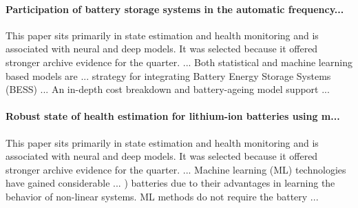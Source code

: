 \documentclass[conference]{IEEEtran}
\begin{document}
\paragraph{Participation of battery storage systems in the automatic frequency...} This paper sits primarily in state estimation and health monitoring and is associated with neural and deep models. It was selected because it offered stronger archive evidence for the quarter. ... Both statistical and machine learning based models are ... strategy for integrating Battery Energy Storage Systems (BESS) ... An in-depth cost breakdown and battery-ageing model support ... \cite{participationofbattery2020}

\paragraph{Robust state of health estimation for lithium-ion batteries using m...} This paper sits primarily in state estimation and health monitoring and is associated with neural and deep models. It was selected because it offered stronger archive evidence for the quarter. ... Machine learning (ML) technologies have gained considerable ... ) batteries due to their advantages in learning the behavior of non-linear systems. ML methods do not require the battery ... \cite{robuststateof2022}
\end{document}
